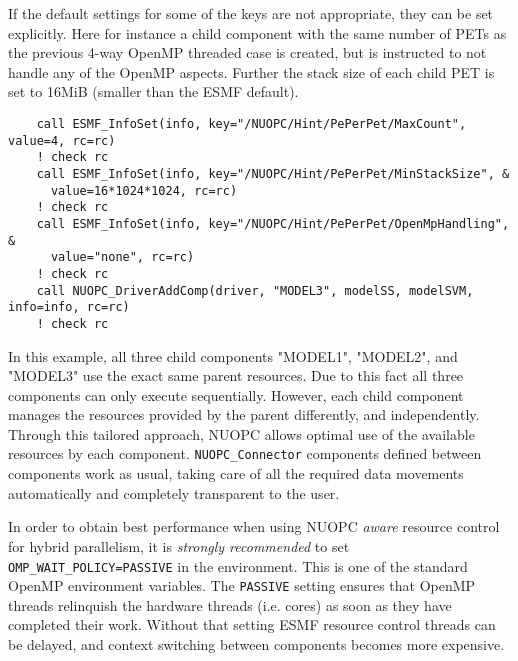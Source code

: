 If the default settings for some of the keys are not appropriate, they can be set explicitly. Here for instance a child component with the same number of PETs as the previous 4-way OpenMP threaded case is created, but is instructed to not handle any of the OpenMP aspects. Further the stack size of each child PET is set to 16MiB (smaller than the ESMF default).

\begin{verbatim}
    call ESMF_InfoSet(info, key="/NUOPC/Hint/PePerPet/MaxCount", value=4, rc=rc)
    ! check rc
    call ESMF_InfoSet(info, key="/NUOPC/Hint/PePerPet/MinStackSize", &
      value=16*1024*1024, rc=rc)
    ! check rc
    call ESMF_InfoSet(info, key="/NUOPC/Hint/PePerPet/OpenMpHandling", &
      value="none", rc=rc)
    ! check rc
    call NUOPC_DriverAddComp(driver, "MODEL3", modelSS, modelSVM, info=info, rc=rc)
    ! check rc
\end{verbatim}

In this example, all three child components "MODEL1", "MODEL2", and "MODEL3" use the exact same parent resources. Due to this fact all three components can only execute sequentially. However, each child component manages the resources provided by the parent differently, and independently. Through this tailored approach, NUOPC allows optimal use of the available resources by each component. {\tt NUOPC\_Connector} components defined between components work as usual, taking care of all the required data movements automatically and completely transparent to the user.

In order to obtain best performance when using NUOPC {\em aware} resource control for hybrid parallelism, it is {\em strongly recommended} to set {\tt OMP\_WAIT\_POLICY=PASSIVE} in the environment. This is one of the standard OpenMP environment variables. The {\tt PASSIVE} setting ensures that OpenMP threads relinquish the hardware threads (i.e. cores) as soon as they have completed their work. Without that setting ESMF resource control threads can be delayed, and context switching between components becomes more expensive.
